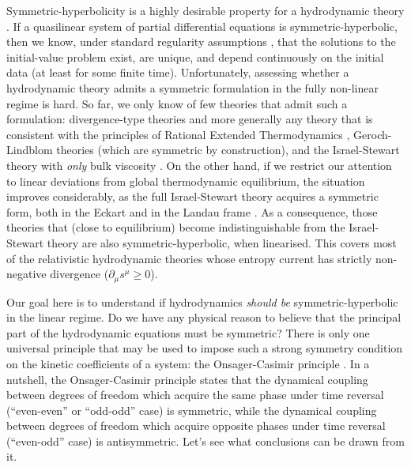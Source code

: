 \documentclass[a4paper, amsfonts, amssymb, amsmath, reprint, showkeys, nofootinbib, twoside, onecolumn,notitlepage]{revtex4-1}
\begin{document}
Symmetric-hyperbolicity is a highly desirable property for a hydrodynamic theory \cite{CourantHilbert2_book,GerochPartial1996,
Frittelli1996}. If a quasilinear system of partial differential equations is symmetric-hyperbolic, then we know, under standard regularity assumptions \cite{Kato2009}, that the solutions to the initial-value problem exist, are unique, and depend continuously on the initial data (at least for some finite time). Unfortunately, assessing whether a hydrodynamic theory admits a symmetric formulation in the fully non-linear regime is hard. So far, we only know of few theories that admit such a formulation: divergence-type theories \cite{GerochLindblom1990} and more generally any theory that is consistent with the principles of Rational Extended Thermodynamics \cite{Muller_book,Ruggeri1981,RuggeriMagneto1981}, Geroch-Lindblom theories \cite{Geroch_Lindblom_1991_causal,
LindblomRelaxation1996,GavassinoNonHydro2022} (which are symmetric by construction), and the Israel-Stewart theory with \textit{only} bulk viscosity \cite{Causality_bulk}. On the other hand, if we restrict our attention to linear deviations from global thermodynamic equilibrium, the situation improves considerably, as the full Israel-Stewart theory acquires a symmetric form, both in the Eckart \cite{Hishcock1983} and in the Landau frame \cite{OlsonLifsh1990}. As a consequence, those theories that (close to equilibrium) become indistinguishable from the Israel-Stewart theory \cite{noto_rel,PriouCOMPAR1991,Lopez09,Otting1_1998,
Denicol2012Boltzmann,BulkGavassino,
GavassinoRadiazione,Stricker2019,GavassinoGENERIC2022} are also symmetric-hyperbolic, when linearised. This covers most of the relativistic hydrodynamic theories whose entropy current has strictly non-negative divergence ($\partial_\mu s^\mu \geq 0$).

Our goal here is to understand if hydrodynamics \textit{should be} symmetric-hyperbolic in the linear regime. Do we have any physical reason to believe that the principal part of the hydrodynamic equations must be symmetric? There is only one universal principle that may be used to impose such a strong symmetry condition on the kinetic coefficients of a system: the Onsager-Casimir principle \cite{Onsager_1931,Onsager_Casimir,landau5,Meixner1963,
Kubo1957,Pavelka2014}. 
In a nutshell, the Onsager-Casimir principle states that the dynamical coupling between degrees of freedom which acquire the same phase under time reversal (``even-even'' or ``odd-odd'' case) is symmetric, while the dynamical coupling between degrees of freedom which acquire opposite phases under time reversal (``even-odd'' case) is antisymmetric.
Let's see what conclusions can be drawn from it.
\end{document}
